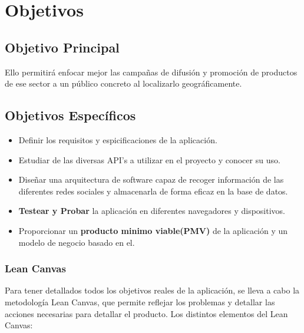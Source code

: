 \chapter{Objetivos}


\section{Objetivo Principal}


Ello permitirá enfocar mejor las campañas de difusión y promoción de productos de ese sector a un público concreto al localizarlo geográficamente.

\vspace{5 mm}

\section{Objetivos Específicos}

\begin{itemize}
  \item Definir los requisitos y espicificaciones de la aplicación.
  \item Estudiar de las diversas API's a utilizar en el proyecto y conocer su uso.
  \item Diseñar una arquitectura de software capaz de recoger información de las diferentes redes sociales y almacenarla de forma eficaz en la base de datos.
  \item \textbf{Testear y Probar} la aplicación en diferentes navegadores y dispositivos.
  \item Proporcionar un \textbf{producto minimo viable(PMV)} de la aplicación y un modelo de negocio basado en el.
\end{itemize}

\subsection{Lean Canvas}

Para tener detallados todos los objetivos reales de la aplicación, se lleva a cabo la metodología Lean Canvas, que permite reflejar los problemas y detallar las acciones necesarias para detallar el producto. Los distintos elementos del Lean Canvas:

